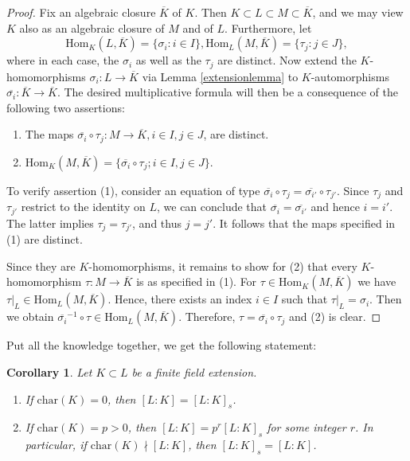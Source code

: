 \documentclass[12pt]{report}
\newtheorem{cor}[thm]{Corollary}
\theoremstyle{definition}
\def\Hom{\text{Hom}}
\def\char{\text{char}}
\begin{document}
\begin{proof}
    Fix an algebraic closure $\overline{K}$ of $K$. Then $K \subset L \subset M \subset \overline{K}$, and we may view $K$ also as an algebraic closure of $M$ and of $L$. Furthermore, let
    $$\Hom_K(L,\overline{K}) = \{\sigma_i: i \in I\}, \Hom_L(M,\overline{K}) = \{\tau_j: j \in J\},$$ where in each case, the $\sigma_i$ as well as the $\tau_j$ are distinct. Now extend the $K$-homomorphisms $\sigma_i : L \to \overline{K}$ via Lemma \ref{extensionlemma} to $K$-automorphisms $\overline{\sigma_i}: \overline{K} \to \overline{K}$. 
    The desired multiplicative formula will then be a consequence of the following two assertions:
    \begin{enumerate}
        \item The maps $\overline{\sigma_i} \circ \tau_j : M \to \overline{K}, i \in I, j \in J$, are distinct.
        \item $\Hom_K(M,\overline{K}) = \{\overline{\sigma_i} \circ \tau_j ; i \in I, j \in J\}.$
    \end{enumerate}
    
    To verify assertion (1), consider an equation of type $\overline{\sigma_i} \circ \tau_j = \overline{\sigma_{i'}} \circ \tau_{j'}$. Since $\tau_j$ and $\tau_{j'}$ restrict to the identity on $L$, we can conclude that $\overline{\sigma_i} = \overline{\sigma_{i'}}$ and hence $i = i'$. The latter implies $\tau_j = \tau_{j'}$, and thus $j = j'$. It follows that the maps specified in (1) are distinct.
    
    Since they are  $K$-homomorphisms, it remains to show for (2) that every $K$-homomorphism $\tau : M \to \overline{K}$ is as specified in (1). For $\tau \in \Hom_K(M,\overline{K})$ we have $\tau|_L \in \Hom_L(M,\overline{K})$. Hence, there exists an index $i \in I$ such that $\tau|_L = \sigma_i$. Then we obtain $\overline{\sigma_i}^{-1}\circ\tau \in \Hom_L(M,\overline{K})$. Therefore, $\tau=\overline{\sigma_i}\circ \tau_j$ and (2) is clear.
\end{proof}

Put all the knowledge together, we get the following statement:

\begin{cor}
    Let $K \subset L$ be a finite field extension.
    \begin{enumerate}
        \item If $\char(K) = 0$, then $[L : K] = [L : K]_s$.
        \item If $\char(K) = p > 0$, then $[L : K] = p^r[L : K]_s$ for some integer $r$. In particular, if $\char(K)\nmid [L:K]$, then $[L : K]_s = [L : K]$.
    \end{enumerate}
\end{cor}
\end{document}
